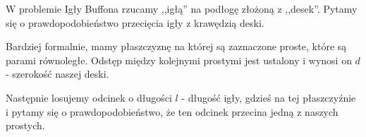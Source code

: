 W problemie Igły Buffona rzucamy ,,igłą''  na podłogę złożoną z ,,desek''. Pytamy się o prawdopodobieństwo przecięcia igły z krawędzią deski.

Bardziej formalnie, mamy płaszczyznę na której są zaznaczone proste, które są parami równoległe. Odstęp między kolejnymi prostymi jest ustalony i wynosi on \(d\) - szerokość naszej deski.


Następnie losujemy odcinek o długości \(l\) - długość igły, gdzieś na tej płaszczyźnie i pytamy się o prawdopodobieństwo, że ten odcinek przecina jedną z naszych prostych.